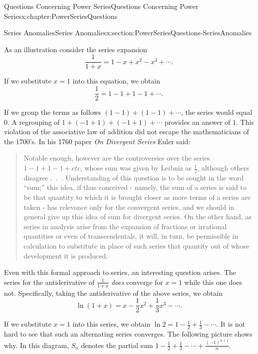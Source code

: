 \begin{chapterptx}{Questions Concerning Power Series}{}{Questions Concerning Power Series}{}{}{x:chapter:PowerSeriesQuestions}
\begin{sectionptx}{Series Anomalies}{}{Series Anomalies}{}{}{x:section:PowerSeriesQuestions-SeriesAnomalies}
		\par
		As an illustration consider the series expansion%
		\begin{equation*}
			\frac{1}{1+x}=1-x+x^2-x^3+\cdots\text{.}
		\end{equation*}
		\par
		If we substitute \(x=1\) into this equation, we obtain%
		\begin{equation*}
			\frac{1}{2}=1-1+1-1+\cdots\text{.}
		\end{equation*}
		\par
		If we group the terms as follows \((1-1)+(1-1)+\cdots\), the series would equal \(0\). A regrouping of \(1+(-1+1)+(-1+1)+\cdots\) provides an answer of \(1\). This violation of the associative law of addition did not escape the mathematicians of the 1700's. In his 1760 paper \emph{On Divergent Series} Euler  said:%
		\begin{quote}%
			Notable enough, however are the controversies over the series \(1-1+1-1+etc\),  whose sum was given by Leibniz as \(\frac{1}{2}\), although others disagree .~.~. Understanding of this question is to be sought in the word ``sum;'' this idea, if thus conceived - namely, the sum of a series is said to be that quantity to which it is brought closer as more terms of a series are taken - has relevance only for the convergent series, and we should in general give up this idea of sum for divergent series. On the other hand, as series in analysis arise from the expansion of fractions or irrational quantities or even of transcendentals, it will, in turn, be permissible in calculation to substitute in place of such series that quantity out of whose development it is produced.%
		\end{quote}
		Even with this formal approach to series, an interesting question arises. The series for the antiderivative of \(\frac{1}{1+x}\) \emph{does} converge for \(x=1\) while this one does not. Specifically, taking the antiderivative of the above series, we obtain%
		\begin{equation*}
			\ln(1+x)=x-\frac{1}{2}x^2+\frac{1}{3}x^3-\cdots\text{.}
		\end{equation*}
		\par
		If we substitute \(x=1\) into this series, we obtain \(\ln 2=1-\frac{1}{2}+\frac{1}{3}-\cdots\). It is not hard to see that such an alternating series converges. The following picture shows why. In this diagram, \(S_n\) denotes the partial sum \(1-\frac{1}{2}+\frac{1}{3}-\cdots+\frac{(-1)^{n+1}}{n}\).%

\end{sectionptx}
\end{chapterptx}
